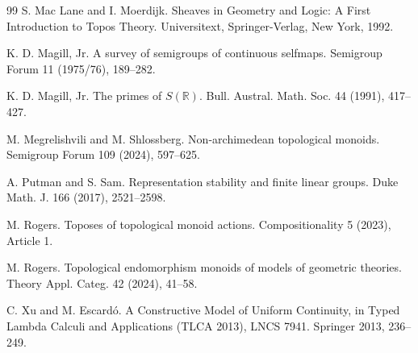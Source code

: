 \documentclass[10pt, reqno]{amsart}
\theoremstyle{plain}
\numberwithin{equation}{section}
\theoremstyle{definition}
\begin{document}
\begin{thebibliography}{99}
 S. Mac Lane and I. Moerdijk. Sheaves in Geometry and Logic: A First Introduction to Topos Theory. Universitext, Springer-Verlag, New York, 1992.

 K. D. Magill, Jr. A survey of semigroups of continuous selfmaps. Semigroup Forum 11 (1975/76), 189--282.

 K. D. Magill, Jr. The primes of $S(\mathbb R)$. Bull. Austral. Math. Soc. 44 (1991), 417--427.

 M. Megrelishvili and M. Shlossberg. Non-archimedean topological monoids. Semigroup Forum 109 (2024), 597--625.

 A. Putman and S. Sam. Representation stability and finite linear groups. Duke Math. J. 166 (2017), 2521--2598.

 M. Rogers. Toposes of topological monoid actions. Compositionality 5 (2023), Article 1.

 M. Rogers. Topological endomorphism monoids of models of geometric theories. Theory Appl. Categ. 42 (2024), 41--58.

 C. Xu and M. Escard\'{o}. A Constructive Model of Uniform Continuity, in Typed Lambda Calculi and Applications (TLCA 2013), LNCS 7941. Springer 2013, 236--249.
\end{thebibliography}
\end{document}
